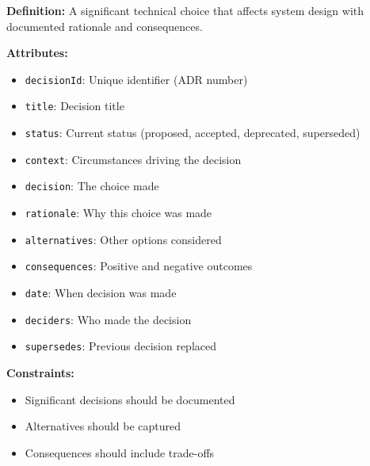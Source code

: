 \documentclass[11pt,letterpaper]{article}
\begin{document}
\begin{definitionbox}
\textbf{Definition:} A significant technical choice that affects system design with documented rationale and consequences.

\textbf{Attributes:}
\begin{itemize}[nosep]
    \item \texttt{decisionId}: Unique identifier (ADR number)
    \item \texttt{title}: Decision title
    \item \texttt{status}: Current status (proposed, accepted, deprecated, superseded)
    \item \texttt{context}: Circumstances driving the decision
    \item \texttt{decision}: The choice made
    \item \texttt{rationale}: Why this choice was made
    \item \texttt{alternatives}: Other options considered
    \item \texttt{consequences}: Positive and negative outcomes
    \item \texttt{date}: When decision was made
    \item \texttt{deciders}: Who made the decision
    \item \texttt{supersedes}: Previous decision replaced
\end{itemize}

\textbf{Constraints:}
\begin{itemize}[nosep]
    \item Significant decisions should be documented
    \item Alternatives should be captured
    \item Consequences should include trade-offs
\end{itemize}
\end{definitionbox}
\end{document}
